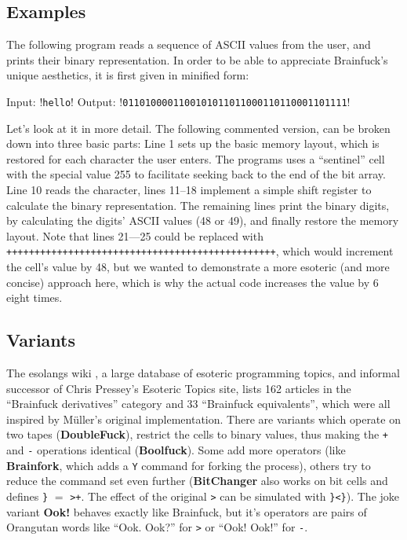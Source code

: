 \subsection{Examples}

The following program reads a sequence of ASCII values from the user, and prints their binary representation. In order to be able to appreciate Brainfuck's unique aesthetics, it is first given in minified form:



\begin{io}
Input: !\texttt{hello}!
Output: !\texttt{0110100001100101011011000110110001101111}!
\end{io}

Let's look at it in more detail. The following commented version, can be broken down into three basic parts: Line 1 sets up the basic memory layout, which is restored for each character the user enters. The programs uses a “sentinel” cell with the special value 255 to facilitate seeking back to the end of the bit array. Line 10 reads the character, lines 11--18 implement a simple shift register to calculate the binary representation. The remaining lines print the binary digits, by calculating the digits' ASCII values (48 or 49), and finally restore the memory layout. Note that lines 21---25 could be replaced with \texttt{++++++++++++++++++++++++++++++++++++++++++++++++}, which would increment the cell's value by 48, but we wanted to demonstrate a more esoteric (and more concise) approach here, which is why the actual code increases the value by 6 eight times.



\subsection{Variants}

The esolangs wiki \cite{esolang}, a large database of esoteric programming topics, and informal successor of Chris Pressey's Esoteric Topics site, lists 162 articles in the “Brainfuck derivatives” category and 33 “Brainfuck equivalents”, which were all inspired by Müller's original implementation. There are variants which operate on two tapes (\textbf{DoubleFuck}), restrict the cells to binary values, thus making the \texttt{+} and \texttt{-} operations identical (\textbf{Boolfuck}). Some add more operators (like \textbf{Brainfork}, which adds a \texttt{Y} command for forking the process), others try to reduce the command set even further (\textbf{BitChanger} also works on bit cells and defines \texttt{\}} $=$ \texttt{>+}. The effect of the original \texttt{>} can be simulated with \texttt{\}<\}}).
The joke variant \textbf{Ook!} behaves exactly like Brainfuck, but it's operators are pairs of Orangutan words like “Ook. Ook?” for \texttt{>} or “Ook! Ook!” for \texttt{-}.

